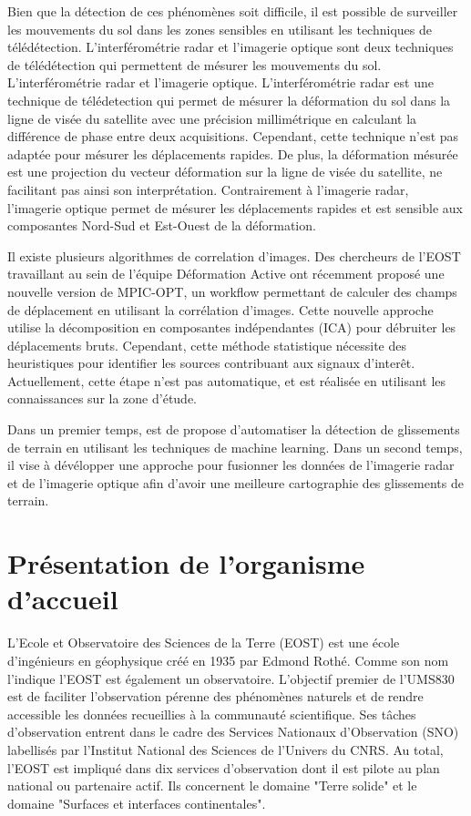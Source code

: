 \documentclass[11pt, openany]{report}
\begin{document}
Bien que la détection de ces phénomènes soit difficile, il est possible de surveiller les mouvements du sol dans les zones sensibles en utilisant les techniques de télédétection. L'interférométrie radar et l'imagerie optique sont deux techniques de télédétection qui permettent de mésurer les mouvements du sol. L'interférométrie radar et l'imagerie optique. L'interférométrie radar est une technique de télédetection qui permet de mésurer la déformation du sol dans la ligne de visée du satellite avec une précision millimétrique en calculant la différence de phase entre deux acquisitions. Cependant, cette technique n'est pas adaptée pour mésurer les déplacements rapides. De plus, la déformation mésurée est une projection du vecteur déformation sur la ligne de visée du satellite, ne facilitant pas ainsi son interprétation. Contrairement à l'imagerie radar, l'imagerie optique permet de mésurer les déplacements rapides et est sensible aux composantes Nord-Sud et Est-Ouest de la déformation.

Il existe plusieurs algorithmes de correlation d'images. Des chercheurs de l'EOST travaillant au sein de l'équipe Déformation Active ont récemment proposé une nouvelle version de MPIC-OPT, un workflow permettant de calculer des champs de déplacement en utilisant la corrélation d'images. Cette nouvelle approche utilise la décomposition en composantes indépendantes (ICA) pour débruiter les déplacements bruts. Cependant, cette méthode statistique nécessite des heuristiques pour identifier les sources contribuant aux signaux d'interêt. Actuellement, cette étape n'est pas automatique, et est réalisée en utilisant les connaissances sur la zone d'étude.\par

Dans un premier temps, est de propose d'automatiser la détection de glissements de terrain en utilisant les techniques de machine learning. Dans un second temps, il vise à dévélopper une approche pour fusionner les données de l'imagerie radar et de l'imagerie optique afin d'avoir une meilleure cartographie des glissements de terrain.

\chapter{Présentation de l'organisme d'accueil}
L'Ecole et Observatoire des Sciences de la Terre (EOST) est une école d'ingénieurs en géophysique
créé en 1935 par Edmond Rothé. Comme son nom l'indique l'EOST est également un observatoire. L’objectif premier de l’UMS830 est de faciliter l'observation pérenne des phénomènes naturels et de rendre accessible les données recueillies à la communauté scientifique. Ses tâches d'observation entrent dans le cadre des Services Nationaux d'Observation (SNO) labellisés par l'Institut National des Sciences de l'Univers du CNRS. Au total, l'EOST est impliqué dans dix services d'observation dont il est pilote au plan national ou partenaire actif. Ils concernent le domaine "Terre solide" et le domaine "Surfaces et interfaces continentales".
\end{document}
